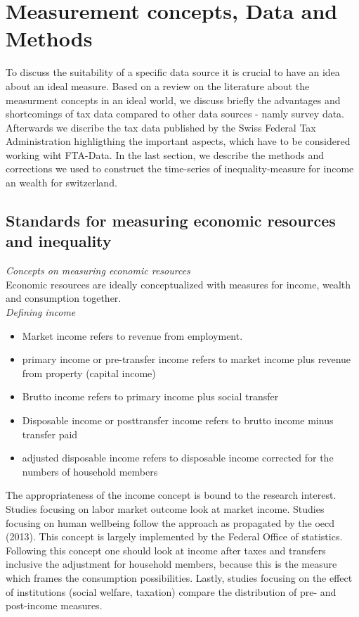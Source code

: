 
\section{Measurement concepts, Data and Methods}

To discuss the suitability of a specific data source it is crucial to have an idea about an ideal measure. Based on a review on the literature about the measurment concepts in an ideal world, we discuss briefly the advantages and shortcomings of tax data compared to other data sources - namly survey data. Afterwards we discribe the tax data published by the Swiss Federal Tax Administration highligthing the important aspects, which have to be considered working wiht FTA-Data. In the last section, we describe the methods and corrections we used to construct the time-series of inequality-measure for income an wealth for switzerland.

\subsection{Standards for measuring economic resources and inequality}

\emph{Concepts on measuring economic resources}  \\
Economic resources are ideally conceptualized with measures for income, wealth and consumption together. \\

\emph{Defining income}

\begin{itemize}
\item Market income refers to revenue from employment.
\item primary income or pre-transfer income refers to  market income plus revenue from property (capital income)
\item Brutto income refers to  primary income plus social transfer
\item Disposable income or posttransfer income refers to  brutto income minus transfer paid 
\item adjusted disposable income refers to  disposable income corrected for the numbers of household members 
\end{itemize}

The appropriateness of the income concept is bound to the research interest. Studies focusing on labor market outcome look at market income. Studies focusing on human wellbeing follow the approach as propagated by the oecd (2013). This concept is largely implemented by the Federal Office of statistics. Following this concept one should look at income after taxes and transfers inclusive the adjustment for household members, because this is the measure which frames the consumption possibilities. Lastly, studies focusing on the effect of institutions (social welfare, taxation) compare the distribution of pre- and post-income measures. \\   

